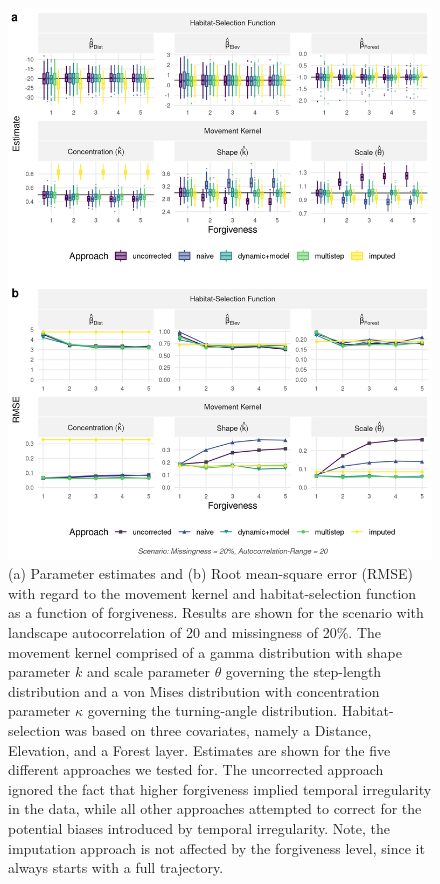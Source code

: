 \documentclass[../FinalThesis.tex]{subfiles}
\begin{document}
\begin{figure}[htpb]
  \begin{center}
  \includegraphics[width = \textwidth]{Figures/ModelComparisonForgiveness.png}
  \caption{(a) Parameter estimates and (b) Root mean-square error (RMSE) with
  regard to the movement kernel and habitat-selection function as a function of
  forgiveness. Results are shown for the scenario with landscape autocorrelation
  of 20 and missingness of 20\%. The movement kernel comprised of a gamma
  distribution with shape parameter $k$ and scale parameter $\theta$ governing
  the step-length distribution and a von Mises distribution with concentration
  parameter $\kappa$ governing the turning-angle distribution. Habitat-selection
  was based on three covariates, namely a \textsf{Distance}, \textsf{Elevation},
  and a \textsf{Forest} layer. Estimates are shown for the five different
  approaches we tested for. The uncorrected approach ignored the fact that
  higher forgiveness implied temporal irregularity in the data, while all other
  approaches attempted to correct for the potential biases introduced by
  temporal irregularity. Note, the imputation approach is not affected by the
  forgiveness level, since it always starts with a full trajectory.}
  \label{ModelComparisonForgiveness}
  \end{center}
\end{figure}
\end{document}
